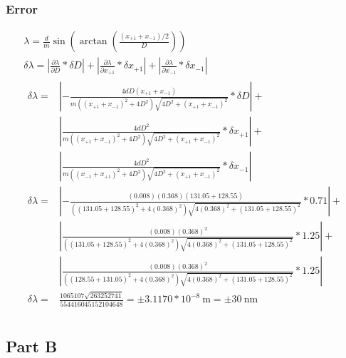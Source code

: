 \documentclass{report}
\begin{document}
\subsubsection*{Error}
$$
\begin{gathered}
    \lambda = \frac{d}{m}\sin \left(\arctan \left( \frac{(x_{+1} + x_{-1}) /2}{D} \right)\right) \\
    \delta \lambda=\left|\frac{\partial \lambda}{\partial D} * \delta D\right|+\left|\frac{\partial \lambda}{\partial x_{+1}} * \delta x_{+1}\right|+ \left|\frac{\partial \lambda}{\partial x_{-1}} * \delta x_{-1}\right| \\
    \begin{aligned}
    \delta \lambda=&\left|-\frac{4dD\left(x_{+1}+x_{-1}\right)}{m\left(\left(x_{+1}+x_{-1}\right)^2+4D^2\right)\sqrt{4D^2+\left(x_{+1}+x_{-1}\right)^2}} * \delta D\right|+ \\
    &\left|\frac{4dD^2}{m\left(\left(x_{+1}+x_{-1}\right)^2+4D^2\right)\sqrt{4D^2+\left(x_{+1}+x_{-1}\right)^2}} * \delta x_{+1}\right|+  \\
    &\left|\frac{4dD^2}{m\left(\left(x_{-1}+x_{+1}\right)^2+4D^2\right)\sqrt{4D^2+\left(x_{+1}+x_{-1}\right)^2}} * \delta x_{-1}\right| \\
    \delta \lambda=&\left|-\frac{(0.008)(0.368)\left(131.05+128.55\right)}{\left(\left(131.05+128.55\right)^2+4(0.368)^2\right)\sqrt{4(0.368)^2+\left(131.05+128.55\right)^2}} * 0.71\right|+ \\
    &\left|\frac{(0.008)(0.368)^2}{\left(\left(131.05+128.55\right)^2+4(0.368)^2\right)\sqrt{4(0.368)^2+\left(131.05+128.55\right)^2}} *1.25\right|+  \\
    &\left|\frac{(0.008)(0.368)^2}{\left(\left(128.55+131.05\right)^2+4(0.368)^2\right)\sqrt{4(0.368)^2+\left(131.05+128.55\right)^2}} *1.25\right| \\
    \delta \lambda=&\frac{1065107 \sqrt{263252741}}{554416045152104648 }= \pm 3.1170*10^{-8} \ \mathrm{m} = \pm 30 \ \mathrm{nm}     \end{aligned} \\
\end{gathered}
$$


\subsection*{Part B}
\end{document}
